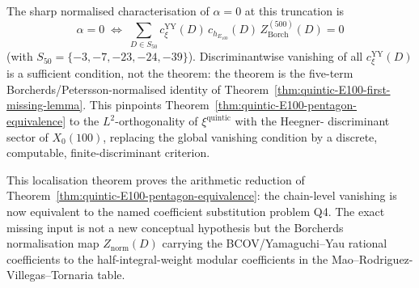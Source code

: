 \begin{remark}
The sharp normalised characterisation of $\alpha=0$ at this truncation is
\[
 \alpha = 0
 \;\iff\;
 \sum_{D\in S_{50}}
 c_{\xi}^{\mathrm{YY}}(D)\,
 c_{h_{E_{100}}}(D)\,
 Z_{\mathrm{Borch}}^{(500)}(D)
 =0
\]
(with \(S_{50}=\{-3,-7,-23,-24,-39\}\)). Discriminantwise vanishing of
all \(c_{\xi}^{\mathrm{YY}}(D)\) is a sufficient condition, not the
theorem: the theorem is the five-term Borcherds/Petersson-normalised
identity of Theorem~\ref{thm:quintic-E100-first-missing-lemma}. This pinpoints
Theorem~\ref{thm:quintic-E100-pentagon-equivalence} to the
$L^2$-orthogonality of $\xi^{\mathrm{quintic}}$ with the Heegner-
discriminant sector of $X_0(100)$, replacing the global vanishing
condition by a discrete, computable, finite-discriminant
criterion.

This localisation theorem proves the arithmetic reduction of
Theorem~\ref{thm:quintic-E100-pentagon-equivalence}: the
chain-level vanishing is now equivalent to the named coefficient
substitution problem \textup{Q4}. The exact missing input is not a new
conceptual hypothesis but the Borcherds normalisation map
$Z_{\mathrm{norm}}(D)$ carrying the BCOV/Yamaguchi--Yau rational
coefficients to the half-integral-weight modular coefficients in the
Mao--Rodriguez-Villegas--Tornaria table.
\end{remark}

